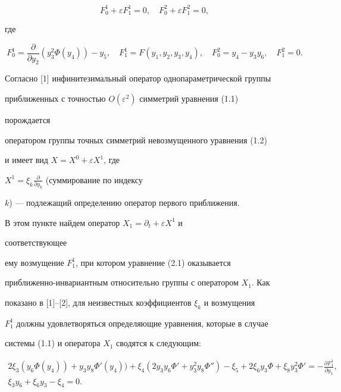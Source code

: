 \begin{equation} 


F^1_0+\varepsilon F^1_1=0,\quad 


F^2_0+\varepsilon F^2_1=0,\tag{2.1} 


\end{equation} 


где 


$$ 


F^1_0=\frac{\partial}{\partial y_2} 


(y^2_3\Phi(y_4))-y_5,\quad 


F^1_1=F(y_1,y_2,y_3,y_4),\quad 


F^2_0=y_4-y_3y_6,\quad F^2_1=0. 


$$ 


Согласно [1] инфинитезимальный оператор однопараметрической группы 


приближенных с точностью $O(\varepsilon^2)$ симметрий уравнения (1.1) 


порождается 


оператором группы точных симметрий невозмущенного уравнения (1.2) 


и имеет вид $X=X^0+\varepsilon X^1$, где 


$X^1=\xi_k\frac{\partial}{\partial y_k}$ (суммирование по индексу 


$k$) --- подлежащий определению оператор первого приближения. 


 


В этом пункте найдем оператор $X_1=\partial_t+\varepsilon X^1$ и 


соответствующее 


ему возмущение $F^1_1$, при котором уравнение (2.1) оказывается 


приближенно-инвариантным относительно группы с оператором $X_1$. Как 


показано в [1]--[2], для неизвестных коэффициентов $\xi_k$ и возмущения 


$F^1_1$ должны удовлетворяться определяющие уравнения, которые в случае 


системы (1.1) и оператора $X_1$ сводятся к следующим: 


\begin{gather} 


2\xi_3(y_6\Phi(y_4))+y_3y_8\Phi'(y_4))+ 


\xi_4(2y_3y_6\Phi'+y^2_3y_8\Phi'')-\xi_5+ 


2\xi_6y_3\Phi+\xi_8y^2_3\Phi'= 


-\frac{\partial F^1_1}{\partial y_1},\tag{2.2}\\ 


% 


\xi_3y_6+\xi_6y_3-\xi_4=0.\tag{2.3} 


\end{gather} 


